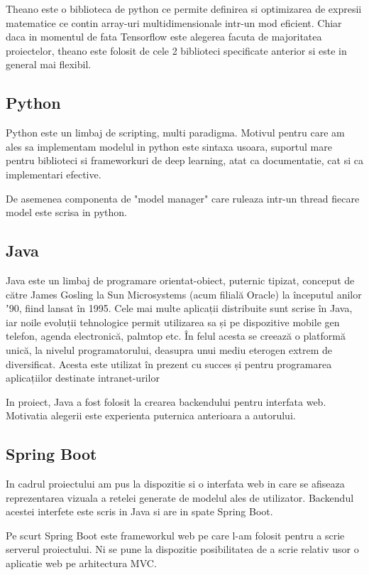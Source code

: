 \documentclass[12pt]{article}
\begin{document}
Theano este o biblioteca de python ce permite definirea si optimizarea de expresii matematice ce contin array-uri multidimensionale intr-un mod eficient. Chiar daca in momentul de fata Tensorflow este alegerea facuta de majoritatea proiectelor, theano este folosit de cele 2 biblioteci specificate anterior si este in general mai flexibil.

\subsection{Python}

Python este un limbaj de scripting, multi paradigma. Motivul pentru care am ales sa implementam modelul in python este sintaxa usoara, suportul mare pentru biblioteci si frameworkuri de deep learning, atat ca documentatie, cat si ca implementari efective. 

De asemenea componenta de "model manager" care ruleaza intr-un thread fiecare model este scrisa in python.


\subsection{Java}

Java este un limbaj de programare orientat-obiect, puternic tipizat, conceput de către James Gosling la Sun Microsystems (acum filială Oracle) la începutul anilor ʼ90, fiind lansat în 1995. Cele mai multe aplicații distribuite sunt scrise în Java, iar noile evoluții tehnologice permit utilizarea sa și pe dispozitive mobile gen telefon, agenda electronică, palmtop etc. În felul acesta se creează o platformă unică, la nivelul programatorului, deasupra unui mediu eterogen extrem de diversificat. Acesta este utilizat în prezent cu succes și pentru programarea aplicațiilor destinate intranet-urilor

In proiect, Java a fost folosit la crearea backendului pentru interfata web. Motivatia alegerii este experienta puternica anterioara a autorului.

\subsection{Spring Boot}

In cadrul proiectului am pus la dispozitie si o interfata web in care se afiseaza reprezentarea vizuala a retelei generate de modelul ales de utilizator. Backendul acestei interfete este scris in Java si are in spate Spring Boot.

Pe scurt Spring Boot este frameworkul web pe care l-am folosit pentru a scrie serverul proiectului. Ni se pune la dispozitie posibilitatea de a scrie relativ usor o aplicatie web pe arhitectura MVC. 
\end{document}
